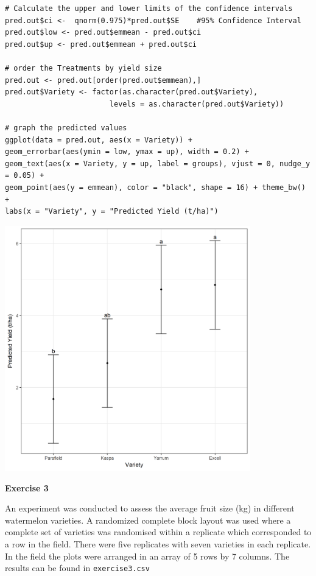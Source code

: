 \documentclass[a4paper, 10pt, fleqn, twosided]{memoir}
\begin{document}
\begin{tcolorbox}[title = Example 3 Graph of predicted values]
\begin{verbatim}
# Calculate the upper and lower limits of the confidence intervals
pred.out$ci <-  qnorm(0.975)*pred.out$SE    #95% Confidence Interval
pred.out$low <- pred.out$emmean - pred.out$ci
pred.out$up <- pred.out$emmean + pred.out$ci

# order the Treatments by yield size
pred.out <- pred.out[order(pred.out$emmean),]
pred.out$Variety <- factor(as.character(pred.out$Variety),
                        levels = as.character(pred.out$Variety))
 
# graph the predicted values 
ggplot(data = pred.out, aes(x = Variety)) +
geom_errorbar(aes(ymin = low, ymax = up), width = 0.2) +
geom_text(aes(x = Variety, y = up, label = groups), vjust = 0, nudge_y = 0.05) +
geom_point(aes(y = emmean), color = "black", shape = 16) + theme_bw() +
labs(x = "Variety", y = "Predicted Yield (t/ha)")
\end{verbatim}
\end{tcolorbox}





\begin{tcolorbox}[title = Example 3 Graph of predicted values]
\includegraphics[width=0.8\textwidth, frame]{Example3Pred.png}
\end{tcolorbox}
\clearpage
\textbf{Exercise 3}

An experiment was conducted to assess the average fruit size (kg) in different watermelon varieties. A randomized
complete block layout was used where a complete set of varieties was randomised within a replicate which corresponded
to a row in the field. There were five replicates with seven varieties in each replicate. In the field the plots were
arranged in an array of 5 rows by 7 columns. The results can be found in \texttt{exercise3.csv}
\end{document}
